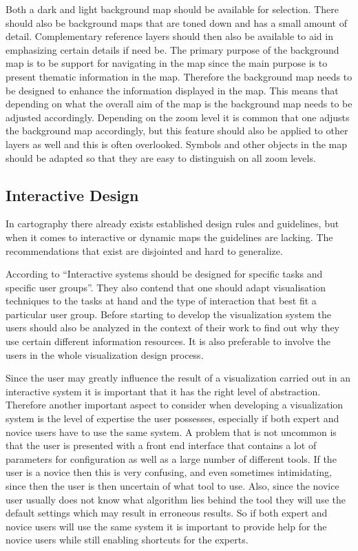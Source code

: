 \documentclass[a4paper,12pt,titlepage]{article}
\begin{document}
Both a dark and light background map should be available for selection. There should also be background maps that are toned down and has a small amount of detail. Complementary reference layers should then also be available to aid in emphasizing certain details if need be. The primary purpose of the background map is to be support for navigating in the map since the main purpose is to present thematic information in the map. Therefore the background map needs to be designed to enhance the information displayed in the map. This means that depending on what the overall aim of the map is the background map needs to be adjusted accordingly. Depending on the zoom level it is common that one adjusts the background map accordingly, but this feature should also be applied to other layers as well and this is often overlooked. Symbols and other objects in the map should be adapted so that they are easy to distinguish on all zoom levels.
\citep{SSIReport}

\subsection{Interactive Design}

In cartography there already exists established design rules and guidelines, but when it comes to interactive or dynamic maps the guidelines are lacking. The recommendations that exist are disjointed and hard to generalize. \citep{Andrienko} 

According to \citet{UserCenterApproach} “Interactive systems should be designed for specific tasks and specific user groups”. They also contend that one should adapt visualisation techniques to the tasks at hand and the type of interaction that best fit a particular user group. Before starting to develop the visualization system the users should also be analyzed in the context of their work to find out why they use certain different information resources. It is also preferable to involve the users in the whole visualization design process.
\citep{UserCenterApproach}

Since the user may greatly influence the result of a visualization carried out in an interactive system it is important that it has the right level of abstraction. Therefore another important aspect to consider when developing a visualization system is the level of expertise the user possesses, especially if both expert and novice users have to use the same system. A problem that is not uncommon is that the user is presented with a front end interface that contains a lot of parameters for configuration as well as a large number of different tools. If the user is a novice then this is very confusing, and even sometimes intimidating, since then the user is then uncertain of what tool to use. Also, since the novice user usually does not know what algorithm lies behind the tool they will use the default settings which may result in erroneous results. So if both expert and novice users will use the same system it is important to provide help for the novice users while still enabling shortcuts for the experts. 
\citep{UserCenterApproach}
\end{document}
